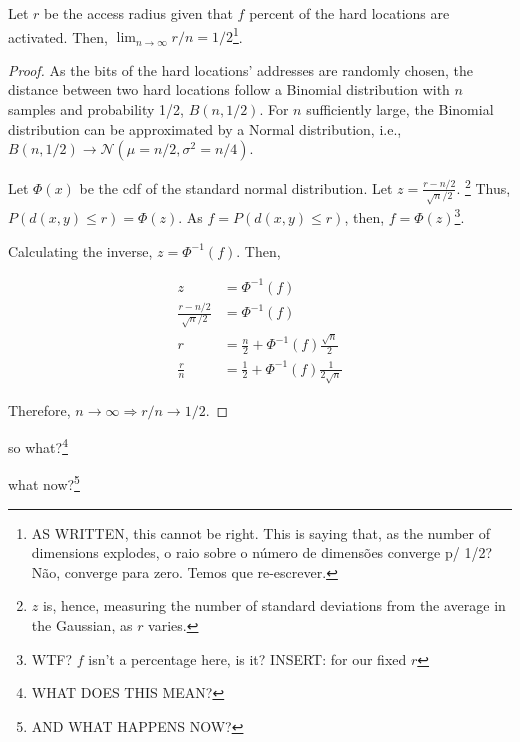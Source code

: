 \begin{lemma}
Let $r$ be the access radius given that $f$ percent of the hard locations are activated. Then, $\lim_{n \rightarrow \infty} r/n = 1/2$\footnote{AS WRITTEN, this cannot be right.  This is saying that, as the number of dimensions explodes, o raio sobre o número de dimensões converge p/ 1/2?  Não, converge para zero.  Temos que re-escrever.}.
\label{thm:sdm-access-radius}
\end{lemma}
\begin{proof}

As the bits of the hard locations' addresses are randomly chosen, the distance between two hard locations follow a Binomial distribution with $n$ samples and probability 1/2, $B(n, 1/2)$. For $n$ sufficiently large, the Binomial distribution can be approximated by a Normal distribution, i.e., $B(n, 1/2) \rightarrow \mathcal{N}(\mu = n/2, \sigma^2 = n/4)$.

Let $\Phi(x)$ be the cdf of the standard normal distribution. Let $z = \frac{r - n/2}{\sqrt{n}/2}$. \footnote{$z$ is, hence, measuring the number of standard deviations from the average in the Gaussian, as $r$ varies.}  Thus, $P(d(x, y) \le r) = \Phi(z)$. As $f = P(d(x, y) \le r)$, then, $f = \Phi(z)$\footnote{WTF?  $f$ isn't a percentage here, is it? INSERT: for our fixed $r$}.

Calculating the inverse, $z = \Phi^{-1}(f)$. Then,

\begin{align}
z &= \Phi^{-1}(f) \\
\frac{r - n/2}{\sqrt{n}/2} &= \Phi^{-1}(f) \\
r &= \frac{n}{2} + \Phi^{-1}(f) \frac{\sqrt{n}}{2} \\
\frac{r}{n} &= \frac{1}{2} + \Phi^{-1}(f) \frac{1}{2 \sqrt{n}}
\end{align}

Therefore, $n \rightarrow \infty \Rightarrow r/n \rightarrow 1/2$.
\end{proof}

so what?\footnote{WHAT DOES THIS MEAN?}

what now?\footnote{AND WHAT HAPPENS NOW?}

